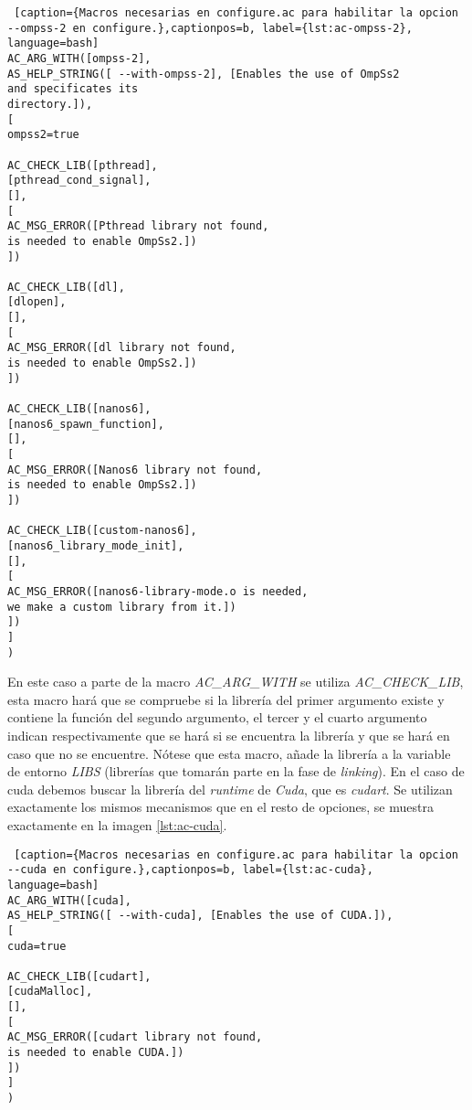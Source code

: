 \bigskip

\begin{minipage}{\linewidth}
\begin{lstlisting} [caption={Macros necesarias en configure.ac para habilitar la opcion --ompss-2 en configure.},captionpos=b, label={lst:ac-ompss-2}, language=bash]
AC_ARG_WITH([ompss-2],
AS_HELP_STRING([ --with-ompss-2], [Enables the use of OmpSs2 
and specificates its 
directory.]),
[
ompss2=true

AC_CHECK_LIB([pthread], 
[pthread_cond_signal], 
[],
[
AC_MSG_ERROR([Pthread library not found, 
is needed to enable OmpSs2.])
])

AC_CHECK_LIB([dl], 
[dlopen], 
[],
[
AC_MSG_ERROR([dl library not found, 
is needed to enable OmpSs2.])
])

AC_CHECK_LIB([nanos6], 
[nanos6_spawn_function], 
[],
[
AC_MSG_ERROR([Nanos6 library not found, 
is needed to enable OmpSs2.])
])

AC_CHECK_LIB([custom-nanos6], 
[nanos6_library_mode_init], 
[],
[
AC_MSG_ERROR([nanos6-library-mode.o is needed, 
we make a custom library from it.])
])
]
)
\end{lstlisting}
\end{minipage}

\par\bigskip

En este caso a parte de la macro \textit{AC\_ARG\_WITH} se utiliza \textit{AC\_CHECK\_LIB}, esta macro hará que se compruebe si la librería del primer argumento existe y contiene la función del segundo argumento, el tercer y el cuarto argumento indican respectivamente que se hará si se encuentra la librería y que se hará en caso que no se encuentre. Nótese que esta macro, añade la librería a la variable de entorno \textit{LIBS} (librerías que tomarán parte en la fase de \textit{linking}). En el caso de cuda debemos buscar la librería del \textit{runtime} de \textit{Cuda}, que es \textit{cudart}. Se utilizan exactamente los mismos mecanismos que en el resto de opciones, se muestra exactamente en la imagen \ref{lst:ac-cuda}.

\bigskip

\begin{minipage}{\linewidth}
\begin{lstlisting} [caption={Macros necesarias en configure.ac para habilitar la opcion --cuda en configure.},captionpos=b, label={lst:ac-cuda}, language=bash]
AC_ARG_WITH([cuda],
AS_HELP_STRING([ --with-cuda], [Enables the use of CUDA.]),
[
cuda=true

AC_CHECK_LIB([cudart], 
[cudaMalloc], 
[],
[
AC_MSG_ERROR([cudart library not found, 
is needed to enable CUDA.])
])
]
)
\end{lstlisting}
\end{minipage}

